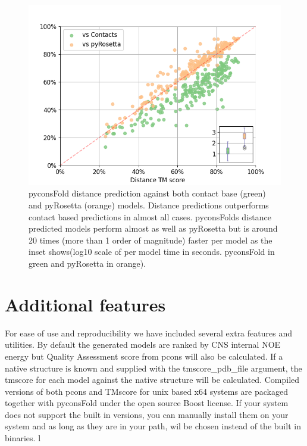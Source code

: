 \documentclass{bioinfo}
\begin{document}
\begin{figure}%
  \centerline{\includegraphics[width=\linewidth]{pyconsFold_figure}}
\caption{pyconsFold distance prediction against both contact base (green) and pyRosetta (orange) models. Distance predictions outperforms contact based predictions in almost all cases. pyconsFolds distance predicted models perform almost as well as pyRosetta but is around 20 times (more than 1 order of magnitude) faster per model as the inset shows(log10 scale of per model time in seconds. pyconsFold in green and pyRosetta in orange).}\label{fig:01}
\end{figure}

\section{Additional features}
For ease of use and reproducibility we have included several extra features and utilities. By default the generated models are ranked by CNS internal NOE energy but Quality Assessment score from pcons \cite{Lundstrom2008-wa} will also be calculated. If a native structure is known and supplied with the tmscore\_pdb\_file argument, the tmscore \cite{Zhang2007-xu,Xu2010-vu} for each model against the native structure will be calculated. 
Compiled versions of both pcons and TMscore for unix based x64 systems are packaged together with pyconsFold under the open source Boost license. If your system does not support the built in versions, you can manually install them on your system and as long as they are in your path, wil be chosen instead of the built in binaries.
l
\end{document}
